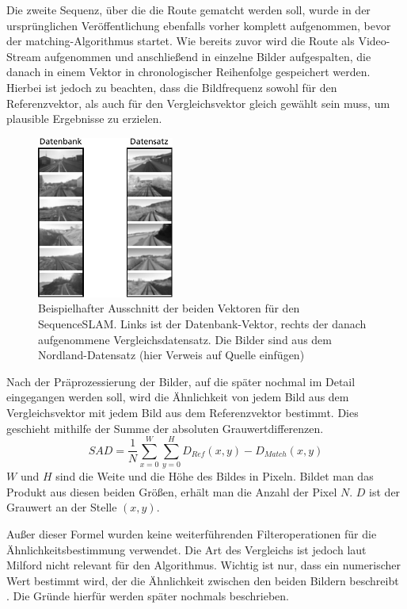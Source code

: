 \documentclass[12pt,a4paper,titlepage]{scrartcl}
\begin{document}
Die zweite Sequenz, über die die Route gematcht werden soll, wurde in der ursprünglichen Veröffentlichung ebenfalls vorher komplett aufgenommen, bevor der matching-Algorithmus startet. Wie bereits zuvor wird die Route als Video-Stream aufgenommen und anschließend in einzelne Bilder aufgespalten, die danach in einem Vektor in chronologischer Reihenfolge gespeichert werden. Hierbei ist jedoch zu beachten, dass die Bildfrequenz sowohl für den Referenzvektor, als auch für den Vergleichsvektor gleich gewählt sein muss, um plausible Ergebnisse zu erzielen.

\begin{figure}[!h]
	\centering
	\includegraphics[width=0.4\textwidth]{../Bilder/Bildvektoren.pdf}
	\caption[Bildvektoren für den SequenceSLAM]{Beispielhafter Ausschnitt der beiden Vektoren für den SequenceSLAM. Links ist der Datenbank-Vektor, rechts der danach aufgenommene Vergleichsdatensatz. Die Bilder sind aus dem Nordland-Datensatz (hier Verweis auf Quelle einfügen)}
	\label{img:vec_ex}
\end{figure}

Nach der Präprozessierung der Bilder, auf die später nochmal im Detail eingegangen werden soll, wird die Ähnlichkeit von jedem Bild aus dem Vergleichsvektor mit jedem Bild aus dem Referenzvektor bestimmt. Dies geschieht mithilfe der Summe der absoluten Grauwertdifferenzen. 
\begin{equation}
SAD=\frac{1}{N}\sum_{x=0}^{W}\sum_{y=0}^{H}D_{Ref}(x,y)-D_{Match}(x, y)
\end{equation}
$W$ und $H$ sind die Weite und die Höhe des Bildes in Pixeln. Bildet man das Produkt aus diesen beiden Größen, erhält man die Anzahl der Pixel $N$. $D$ ist der Grauwert an der Stelle $(x, y)$. 

Außer dieser Formel wurden keine weiterführenden Filteroperationen für die Ähnlichkeitsbestimmung verwendet. Die Art des Vergleichs ist jedoch laut Milford nicht relevant für den Algorithmus. Wichtig ist nur, dass ein numerischer Wert bestimmt wird, der die Ähnlichkeit zwischen den beiden Bildern beschreibt \cite{milford2012seqslam}. Die Gründe hierfür werden später nochmals beschrieben.
\end{document}
